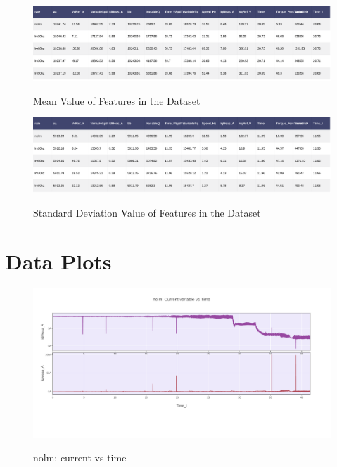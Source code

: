 \documentclass[paper=a4, fontsize=11pt]{scrartcl} %
\numberwithin{equation}{section} %
\numberwithin{figure}{section} %
\numberwithin{table}{section} %
\begin{document}
  \begin{figure}[H]
    \centering
    \href{https://plot.ly/~versag/46/#/}{  \includegraphics[width=1\linewidth]{mean_values_of_features_in_dataset}}
        \caption{Mean Value of Features in the Dataset}
  \end{figure}

  \begin{figure}[H]
    \centering
      \href{https://plot.ly/~versag/28/#/}{\includegraphics[width=1\linewidth]{std_values_of_features_in_dataset}}
        \caption{Standard Deviation Value of Features in the Dataset}
  \end{figure}

\section{Data Plots}

  \begin{figure}[H]
    \centering
      \href{https://plot.ly/~versag/14/#/}{\includegraphics[width=1\linewidth]{nolm_current_vs_time}}
        \caption{nolm: current vs time}
  \end{figure}
\end{document}
